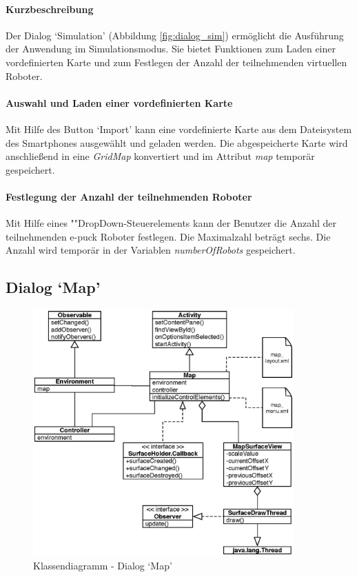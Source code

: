 \documentclass[10pt,a4paper]{article}
\begin{document}
	\paragraph*{Kurzbeschreibung} Der Dialog `Simulation' (Abbildung \ref{fig:dialog_sim}) ermöglicht die Ausführung der Anwendung im
	Simulationsmodus. Sie bietet Funktionen zum Laden einer vordefinierten Karte und zum Festlegen der Anzahl der teilnehmenden virtuellen Roboter.
	
	\paragraph*{Auswahl und Laden einer vordefinierten Karte} Mit Hilfe des Button `Import' kann eine vordefinierte Karte aus dem Dateisystem des
	Smartphones ausgewählt und geladen werden. Die abgespeicherte Karte wird anschließend in eine \textit{GridMap} konvertiert und im Attribut
	\textit{map} temporär gespeichert.
	
	\paragraph*{Festlegung der Anzahl der teilnehmenden Roboter}
	Mit Hilfe eines ""Drop\-Down-Steu\-er\-ele\-ments kann der Benutzer die Anzahl der teilnehmenden e-puck Roboter festlegen. Die Maximalzahl
	beträgt sechs. Die Anzahl wird temporär in der Variablen \textit{numberOfRobots} gespeichert.
	
	\subsection*{Dialog `Map'}
	\label{subsec:dialog_map}
	
	\begin{figure}[h]
			\centering
			\includegraphics[width=10cm]{images/entwurf_map.eps}
  			\caption{Klassendiagramm - Dialog `Map'}
  			\label{fig:dialog_map}
  	\end{figure}
	
\end{document}
